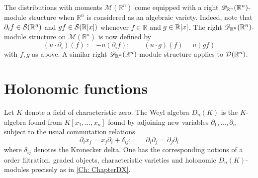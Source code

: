 The distributions with moments $\mathcal{M}(\mathbb{R}^n)$ come equipped with a right $\mathscr{D}_{\mathbb{R}^n}(\mathbb{R}^n)$-module structure when $\mathbb{R}^n$ is considered as an algebraic variety.
Indeed, note that $\partial_i f\in \mathcal{S}(\mathbb{R}^n)$ and $gf\in \mathcal{S}(\mathbb{R}[x])$ whenever $f\in \mathbb{R}$ and $g\in \mathbb{R}[x]$.
The right $\mathscr{D}_{\mathbb{R}^n}(\mathbb{R}^n)$-module structure on $\mathcal{M}(\mathbb{R}^n)$ is now defined by
$$(u\cdot \partial_i)(f) := -u(\partial_i f); \qquad (u\cdot g)(f) = u(gf)$$
with $f,g$ as above.
A similar right $\mathscr{D}_{\mathbb{R}^n}(\mathbb{R}^n)$-module structure applies to $\mathcal{D}(\mathbb{R}^n)$.




\section{Holonomic functions}\label{sec: HolAlgorithm}
Let $K$ denote a field of characteristic zero.
The Weyl algebra $D_n(K)$ is the $K$-algebra found from $K[x_1,\ldots,x_n]$ found by adjoining new variables $\partial_1,\ldots,\partial_n$ subject to the usual commutation relations
$$\partial_i x_j = x_j \partial_i + \delta_{ij};\qquad \partial_i \partial_j = \partial_j \partial_i $$
where $\delta_{ij}$ denotes the Kronecker delta.
One has the corresponding notions of a order filtration, graded objects, characteristic varieties and holonomic $D_n(K)$-modules precisely as in \cref{Ch: ChapterDX}.

